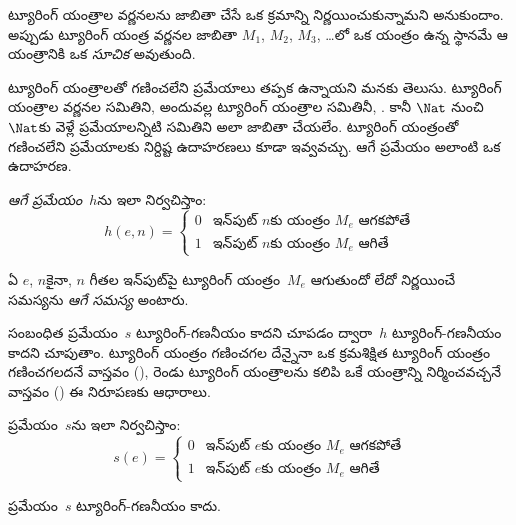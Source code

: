 \documentclass[../../../include/open-logic-section]{subfiles}
\begin{document}

\begin{explain}
ట్యూరింగ్ యంత్రాల వర్ణనలను జాబితా చేసే ఒక క్రమాన్ని నిర్ణయించుకున్నామని అనుకుందాం.
అప్పుడు ట్యూరింగ్ యంత్ర వర్ణనల జాబితా $M_1$, $M_2$, $M_3$, \dots{}లో ఒక యంత్రం
ఉన్న స్థానమే ఆ యంత్రానికి ఒక \emph{సూచిక} అవుతుంది.

ట్యూరింగ్ యంత్రాలతో గణించలేని ప్రమేయాలు తప్పక ఉన్నాయని మనకు తెలుసు. ట్యూరింగ్
యంత్రాల వర్ణనల సమితిని, అందువల్ల ట్యూరింగ్ యంత్రాల సమితినీ, . కానీ
$\Nat$ నుంచి $\Nat$కు వెళ్లే ప్రమేయాలన్నిటి సమితిని అలా జాబితా చేయలేం. ట్యూరింగ్
యంత్రంతో గణించలేని ప్రమేయాలకు నిర్దిష్ట ఉదాహరణలు కూడా ఇవ్వవచ్చు. ఆగే ప్రమేయం
అలాంటి ఒక ఉదాహరణ.
\end{explain}

\begin{defn}[ఆగే ప్రమేయం]
 \emph{ఆగే ప్రమేయం}~$h$ను ఇలా నిర్వచిస్తాం:
\[
h(e,n) =
\begin{cases}
  \text{0} & \text{ఇన్‌పుట్ $n$కు యంత్రం~$M_e$ ఆగకపోతే} \\
  \text{1} & \text{ఇన్‌పుట్ $n$కు యంత్రం~$M_e$ ఆగితే}
\end{cases}
\]
\end{defn}

\begin{defn}[ఆగే సమస్య]
ఏ $e$, $n$కైనా, $n$ గీతల ఇన్‌పుట్‌పై ట్యూరింగ్ యంత్రం~$M_e$ ఆగుతుందో లేదో
నిర్ణయించే సమస్యను \emph{ఆగే సమస్య} అంటారు.
\end{defn}

\begin{explain}
సంబంధిత ప్రమేయం~$s$ ట్యూరింగ్-గణనీయం కాదని చూపడం ద్వారా~$h$
ట్యూరింగ్-గణనీయం కాదని చూపుతాం. ట్యూరింగ్ యంత్రం గణించగల దేన్నైనా ఒక
క్రమశిక్షిత ట్యూరింగ్ యంత్రం గణించగలదనే వాస్తవం (),
రెండు ట్యూరింగ్ యంత్రాలను కలిపి ఒకే యంత్రాన్ని నిర్మించవచ్చనే వాస్తవం
() ఈ నిరూపణకు ఆధారాలు.
\end{explain}

\begin{defn} ప్రమేయం~$s$ను ఇలా నిర్వచిస్తాం:
\[
s(e) =
\begin{cases}
  \text{0} & \text{ఇన్‌పుట్ $e$కు యంత్రం~$M_e$ ఆగకపోతే} \\
  \text{1} & \text{ఇన్‌పుట్ $e$కు యంత్రం~$M_e$ ఆగితే}
\end{cases}
\]
\end{defn}

\begin{lem}
ప్రమేయం~$s$ ట్యూరింగ్-గణనీయం కాదు.
\end{lem}
\end{document}
